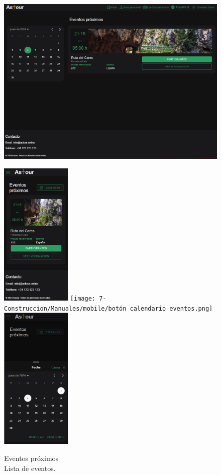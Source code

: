 \begin{figure}[H]
	\centering
	\begin{minipage}{0.45\textwidth}
		\centering
		\includegraphics[width=1\textwidth]{7-Construccion/Manuales/web/eventos proximos lista.png}
		\caption{Eventos próximos \\ Lista de eventos.}
		\label{fig:eventos-proximos-lista-web}
	\end{minipage}
	\hfill
	\begin{minipage}{0.45\textwidth}
		\centering
		\includegraphics[width=0.3\textwidth]{7-Construccion/Manuales/mobile/eventos proximos.png}
		\texttt{[image: 7-Construccion/Manuales/mobile/botón calendario eventos.png]}
		\includegraphics[width=0.3\textwidth]{7-Construccion/Manuales/mobile/calendario eventos.png}

\end{minipage}
\end{figure}
